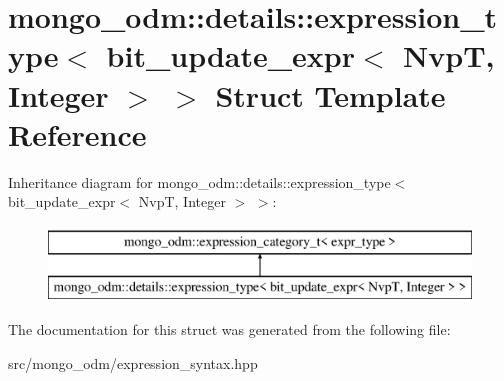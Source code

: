 \hypertarget{structmongo__odm_1_1details_1_1expression__type_3_01bit__update__expr_3_01NvpT_00_01Integer_01_4_01_4}{}\section{mongo\+\_\+odm\+:\+:details\+:\+:expression\+\_\+type$<$ bit\+\_\+update\+\_\+expr$<$ NvpT, Integer $>$ $>$ Struct Template Reference}
\label{structmongo__odm_1_1details_1_1expression__type_3_01bit__update__expr_3_01NvpT_00_01Integer_01_4_01_4}
Inheritance diagram for mongo\+\_\+odm\+:\+:details\+:\+:expression\+\_\+type$<$ bit\+\_\+update\+\_\+expr$<$ NvpT, Integer $>$ $>$\+:\begin{figure}[H]
\begin{center}
\leavevmode
\includegraphics[height=2.000000cm]{structmongo__odm_1_1details_1_1expression__type_3_01bit__update__expr_3_01NvpT_00_01Integer_01_4_01_4}
\end{center}
\end{figure}


The documentation for this struct was generated from the following file\+:\begin{DoxyCompactItemize}
\item 
src/mongo\+\_\+odm/expression\+\_\+syntax.\+hpp\end{DoxyCompactItemize}

